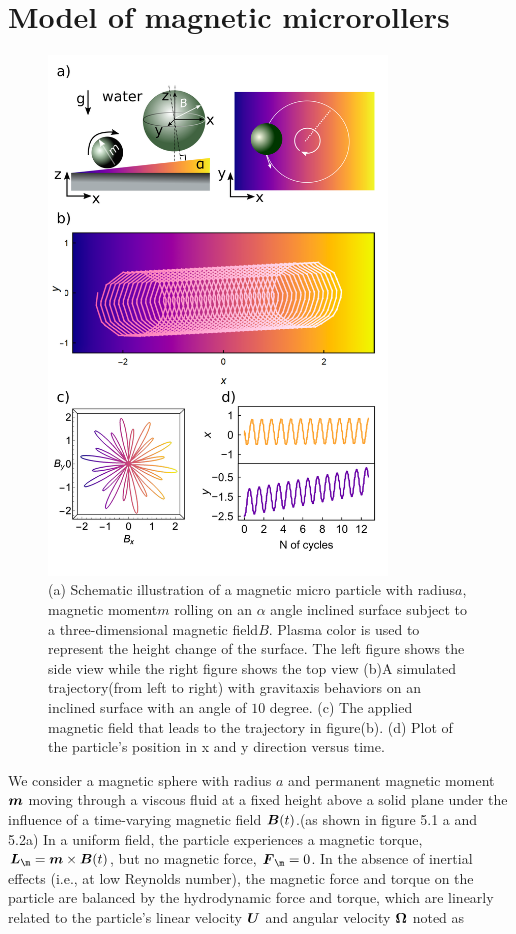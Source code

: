 \section{Model of  magnetic microrollers}
\begin{figure}[p]
\centering
\includegraphics[width=9cm]{figures/5_1.png}
\caption{ (a) Schematic illustration of a magnetic micro particle with radius$a$, magnetic moment$m$ rolling on an $\alpha$ angle inclined surface subject to a three-dimensional magnetic field$B$. Plasma color is used to represent the height change of the surface. The left figure shows the side view while the right figure shows the top view (b)A simulated trajectory(from left to right) with gravitaxis behaviors on an inclined surface with an angle of $10$ degree. (c) The applied magnetic field that leads to the trajectory in figure(b). (d) Plot of the particle's position in x and y direction versus time.}
\label{fig:5.1}
\end{figure}
We consider a magnetic sphere with radius $a$ and permanent magnetic moment $\boldsymbol{m}$ moving through a viscous fluid at a fixed height above a solid plane under the influence of a time-varying magnetic field $\boldsymbol{B}(t)$.(as shown in figure 5.1 a and 5.2a) In a uniform field, the particle experiences a magnetic torque, $\ve{L}_{\m}=\ve{m}\times\ve{B}(t)$, but no magnetic force, $\ve{F}_{\m}=0$. In the absence of inertial effects (i.e., at low Reynolds number), the magnetic force and torque on the particle are balanced by the hydrodynamic force and torque, which are linearly related to the particle's linear velocity $\boldsymbol{U}$ and angular velocity $\boldsymbol{\Omega}$ noted as
